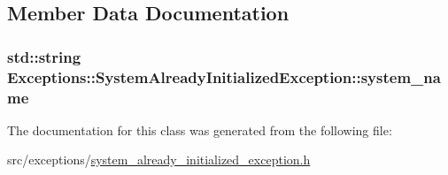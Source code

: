 \subsection{Member Data Documentation}
\hypertarget{class_exceptions_1_1_system_already_initialized_exception_a858d81e072cf8a6a06a4fa506700fb32}{}
\subsubsection[{system\+\_\+name}]{\setlength{\rightskip}{0pt plus 5cm}std\+::string Exceptions\+::\+System\+Already\+Initialized\+Exception\+::system\+\_\+name\hspace{0.3cm}{\ttfamily [private]}}\label{class_exceptions_1_1_system_already_initialized_exception_a858d81e072cf8a6a06a4fa506700fb32}


The documentation for this class was generated from the following file\+:\begin{DoxyCompactItemize}
\item 
src/exceptions/\hyperlink{system__already__initialized__exception_8h}{system\+\_\+already\+\_\+initialized\+\_\+exception.\+h}\end{DoxyCompactItemize}
